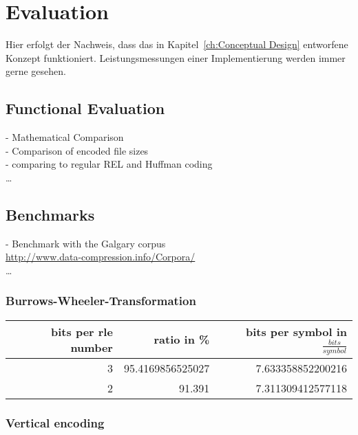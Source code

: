 
\chapter{Evaluation}
\label{ch:Evaluation}
Hier erfolgt der Nachweis, dass das in Kapitel~\ref{ch:Conceptual Design}
entworfene Konzept funktioniert. 
Leistungsmessungen einer Implementierung werden immer gerne gesehen.

\section{Functional Evaluation}
\label{ch:Evaluation:sec:Functional Evaluation}
- Mathematical Comparison\\
- Comparison of encoded file sizes\\
- comparing to regular REL and Huffman coding\\
\ldots

\section{Benchmarks}
\label{ch:Evaluation:sec:Benchmarks}
- Benchmark with the Galgary corpus\\
\url{http://www.data-compression.info/Corpora/} \\
\ldots

\subsection{Burrows-Wheeler-Transformation}

\par{
\begin{center}
	\begin{tabular}[p]{r|r|r}
		\label{tab:t6 run length eval bwt}
		
		bits per rle number & ratio in \% & bits per symbol in $\frac{bits}{symbol}$\\
		\hline
		3 & 95.4169856525027 & 7.633358852200216\\
		2 & 91.391 & 7.311309412577118 \\
	\end{tabular}
\end{center}
}


\subsection{Vertical encoding}
\par{


}

